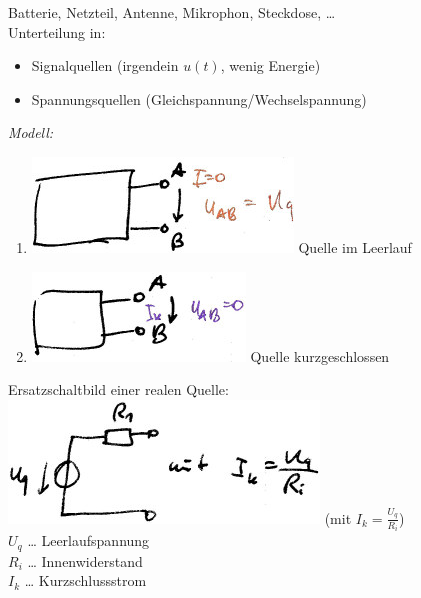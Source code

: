 Batterie, Netzteil, Antenne, Mikrophon, Steckdose, …\smallskip\\
Unterteilung in:
\begin{itemize}
\item Signalquellen (irgendein $u(t)$, wenig Energie)
\item Spannungsquellen (Gleichspannung/Wechselspannung)
\end{itemize}
\emph{Modell:}
\begin{enumerate}
\item \includegraphics[scale=1.5]{Abbildungen/ABB307} Quelle im Leerlauf
\item \includegraphics[scale=1.5]{Abbildungen/ABB308} Quelle kurzgeschlossen
\end{enumerate}
Ersatzschaltbild einer realen Quelle:\\
\includegraphics[scale=1.5]{Abbildungen/ABB309} (mit $I_k=\frac{U_q}{R_i}$)\\
$U_q$ … Leerlaufspannung\\
$R_i$ … Innenwiderstand\\
$I_k$ … Kurzschlussstrom

